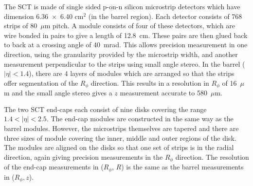 
The SCT is made of single sided p-on-n silicon microstrip detectors which have dimension 6.36~$\times$~6.40 cm$^2$ (in the barrel region). Each detector consists of 768 strips of 80~$\mu$m pitch.
A module consists of four of these detectors, which are wire bonded in pairs to give a length of 12.8~cm. These pairs are then glued back to back at a crossing angle of 40~mrad. This allows precision measurement in one direction, using the granularity provided by the microstrip width, and another measurement perpendicular to the strips using small angle stereo. In the barrel ($|\eta|<1.4$), there are 4 layers of modules which are arranged so that the strips offer segmentation of the $R_{\phi}$ direction. This results in a resolution in $R_{\phi}$ of 16~$\mu$m and the small angle stereo gives a $z$ measurement accurate to 580~$\mu$m. 

The two SCT end-caps each consist of nine disks covering the range $1.4<|\eta|<2.5$. The end-cap modules are constructed in the same way as the barrel modules. However, the microstrips themselves are tapered and there are three sizes of module covering the inner, middle and outer regions of the disk. The modules are aligned on the disks so that one set of strips is in the radial direction, again giving precision measurements in the $R_{\phi}$ direction. The resolution of the end-cap measurements in ($R_{\phi}$, $R$) is the same as the barrel measurements in ($R_{\phi}, z$).

